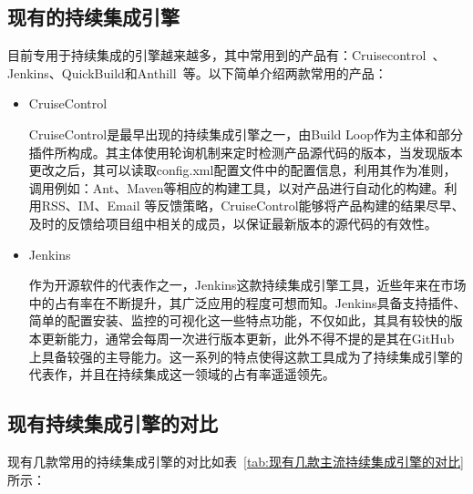 	\subsection{现有的持续集成引擎}
	
	目前专用于持续集成的引擎越来越多，其中常用到的产品有：Cruisecontrol~\cite{47}、Jenkins、QuickBuild和Anthill~\cite{48}等。以下简单介绍两款常用的产品：

	\begin{itemize}
		\item CruiseControl
		
		CruiseControl是最早出现的持续集成引擎之一，由Build Loop作为主体和部分插件所构成。其主体使用轮询机制来定时检测产品源代码的版本，当发现版本更改之后，其可以读取config.xml配置文件中的配置信息，利用其作为准则，调用例如：Ant、Maven等相应的构建工具，以对产品进行自动化的构建。利用RSS、IM、Email 等反馈策略，CruiseControl能够将产品构建的结果尽早、及时的反馈给项目组中相关的成员，以保证最新版本的源代码的有效性。
		\item Jenkins
		
		作为开源软件的代表作之一，Jenkins这款持续集成引擎工具，近些年来在市场中的占有率在不断提升，其广泛应用的程度可想而知。Jenkins具备支持插件、简单的配置安装、监控的可视化这一些特点功能，不仅如此，其具有较快的版本更新能力，通常会每周一次进行版本更新，此外不得不提的是其在GitHub上具备较强的主导能力。这一系列的特点使得这款工具成为了持续集成引擎的代表作，并且在持续集成这一领域的占有率遥遥领先。~\cite{26, 27}
	\end{itemize}
	
	\subsection{现有持续集成引擎的对比}
	
	现有几款常用的持续集成引擎的对比如表~\ref{tab:现有几款主流持续集成引擎的对比}所示：
	
